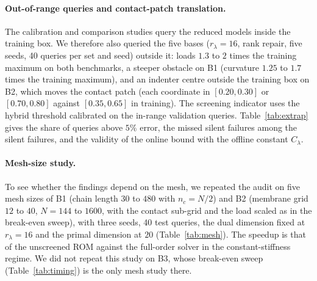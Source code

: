 \documentclass[11pt,a4paper]{article}
\begin{document}
\paragraph{Out-of-range queries and contact-patch translation.}
The calibration and comparison studies query the reduced models inside the training box. We therefore also queried the five bases ($r_\lambda = 16$, rank repair, five seeds, 40 queries per set and seed) outside it: loads $1.3$ to $2$ times the training maximum on both benchmarks, a steeper obstacle on B1 (curvature $1.25$ to $1.7$ times the training maximum), and an indenter centre outside the training box on B2, which moves the contact patch (each coordinate in $[0.20, 0.30]$ or $[0.70, 0.80]$ against $[0.35, 0.65]$ in training). The screening indicator uses the hybrid threshold calibrated on the in-range validation queries. Table~\ref{tab:extrap} gives the share of queries above $5\%$ error, the missed silent failures among the silent failures, and the validity of the online bound with the offline constant $C_\lambda$.

\begin{table}[htbp]
\centering
\footnotesize
\setlength{\tabcolsep}{3pt}
\caption{Out-of-range queries. Cells: share of queries above $5\%$ error in \% (silent failures missed by the screening indicator / silent failures), five seeds pooled (200 queries per cell). The screening indicator uses the hybrid threshold of Eq.~\eqref{eq:eta-adm} calibrated on the 40 in-range validation queries of each seed. Last column: smallest share, over the five bases, of queries on which the bound with the offline constant $C_\lambda$ is at least the true error; the bound with the exact multiplier norm held on every query in every set.}
\label{tab:extrap}

\end{table}

\paragraph{Mesh-size study.}
To see whether the findings depend on the mesh, we repeated the audit on five mesh sizes of B1 (chain length $30$ to $480$ with $n_c = N/2$) and B2 (membrane grid $12$ to $40$, $N = 144$ to $1600$, with the contact sub-grid and the load scaled as in the break-even sweep), with three seeds, 40 test queries, the dual dimension fixed at $r_\lambda = 16$ and the primal dimension at $20$ (Table~\ref{tab:mesh}). The speedup is that of the unscreened ROM against the full-order solver in the constant-stiffness regime. We did not repeat this study on B3, whose break-even sweep (Table~\ref{tab:timing}) is the only mesh study there.
\end{document}
